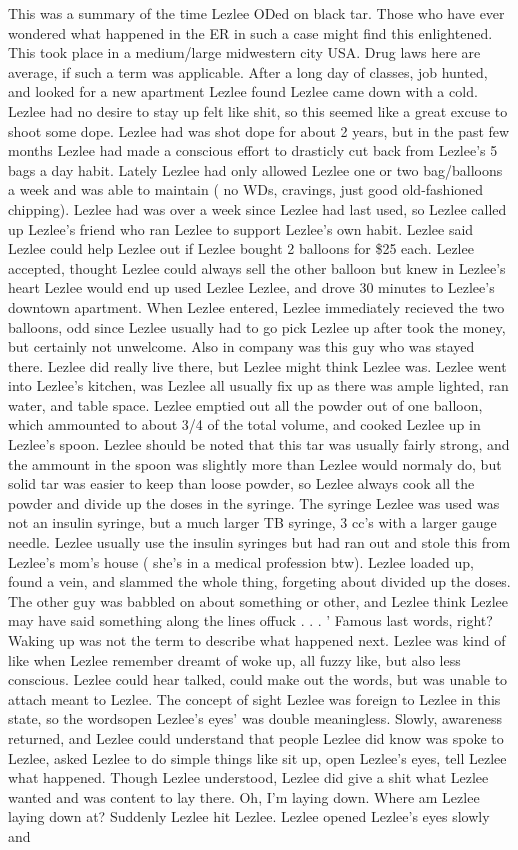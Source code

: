 \documentclass[12pt]{book}
\begin{document}
This was a summary of the time Lezlee ODed on black tar. Those who have ever wondered what happened in the ER in such a case might find this enlightened. This took place in a medium/large midwestern city USA. Drug laws here are average, if such a term was applicable. After a long day of classes, job hunted, and looked for a new apartment Lezlee found Lezlee came down with a cold. Lezlee had no desire to stay up felt like shit, so this seemed like a great excuse to shoot some dope. Lezlee had was shot dope for about 2 years, but in the past few months Lezlee had made a conscious effort to drasticly cut back from Lezlee's 5 bags a day habit. Lately Lezlee had only allowed Lezlee one or two bag/balloons a week and was able to maintain ( no WDs, cravings, just good old-fashioned chipping). Lezlee had was over a week since Lezlee had last used, so Lezlee called up Lezlee's friend who ran Lezlee to support Lezlee's own habit. Lezlee said Lezlee could help Lezlee out if Lezlee bought 2 balloons for \$25 each. Lezlee accepted, thought Lezlee could always sell the other balloon but knew in Lezlee's heart Lezlee would end up used Lezlee Lezlee, and drove 30 minutes to Lezlee's downtown apartment. When Lezlee entered, Lezlee immediately recieved the two balloons, odd since Lezlee usually had to go pick Lezlee up after took the money, but certainly not unwelcome. Also in company was this guy who was stayed there. Lezlee did really live there, but Lezlee might think Lezlee was. Lezlee went into Lezlee's kitchen, was Lezlee all usually fix up as there was ample lighted, ran water, and table space. Lezlee emptied out all the powder out of one balloon, which ammounted to about 3/4 of the total volume, and cooked Lezlee up in Lezlee's spoon. Lezlee should be noted that this tar was usually fairly strong, and the ammount in the spoon was slightly more than Lezlee would normaly do, but solid tar was easier to keep than loose powder, so Lezlee always cook all the powder and divide up the doses in the syringe. The syringe Lezlee was used was not an insulin syringe, but a much larger TB syringe, 3 cc's with a larger gauge needle. Lezlee usually use the insulin syringes but had ran out and stole this from Lezlee's mom's house ( she's in a medical profession btw). Lezlee loaded up, found a vein, and slammed the whole thing, forgeting about divided up the doses. The other guy was babbled on about something or other, and Lezlee think Lezlee may have said something along the lines offuck . . .  ' Famous last words, right? Waking up was not the term to describe what happened next. Lezlee was kind of like when Lezlee remember dreamt of woke up, all fuzzy like, but also less conscious. Lezlee could hear talked, could make out the words, but was unable to attach meant to Lezlee. The concept of sight Lezlee was foreign to Lezlee in this state, so the wordsopen Lezlee's eyes' was double meaningless. Slowly, awareness returned, and Lezlee could understand that people Lezlee did know was spoke to Lezlee, asked Lezlee to do simple things like sit up, open Lezlee's eyes, tell Lezlee what happened. Though Lezlee understood, Lezlee did give a shit what Lezlee wanted and was content to lay there. Oh, I'm laying down. Where am Lezlee laying down at? Suddenly Lezlee hit Lezlee. Lezlee opened Lezlee's eyes slowly and 
\end{document}
